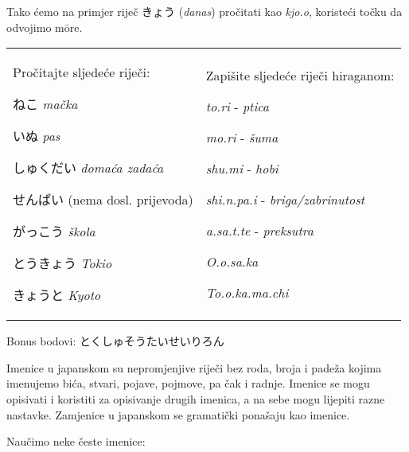 	\vspace{5pt}
	Tako ćemo na primjer riječ きょう (\textit{danas}) pročitati kao \textit{kjo.o}, koristeći točku da odvojimo m\={o}re.
	
	
	\begin{tabular}{p{200pt} p{200pt}}
		\begin{mondai}{Pročitajte sljedeće riječi:}
			\item ねこ \textit{mačka}
			\item いぬ \textit{pas}
			\item しゅくだい \textit{domaća zadaća}
			\item せんぱい (nema dosl. prijevoda)
			\item がっこう \textit{škola}
			\item とうきょう \textit{Tokio}
			\item きょうと \textit{Kyoto}
		\end{mondai}
		&
		\begin{mondai}{Zapišite sljedeće riječi hiraganom:}
			\item \textit{to.ri} - \textit{ptica}
			\item \textit{mo.ri} - \textit{šuma}
			\item \textit{shu.mi} - \textit{hobi}
			\item \textit{shi.n.pa.i} - \textit{briga/zabrinutost}
			\item \textit{a.sa.t.te} - \textit{preksutra}
			\item \textit{O.o.sa.ka}
			\item \textit{To.o.ka.ma.chi}
		\end{mondai}\\
	\end{tabular}
	
	Bonus bodovi: とくしゅそうたいせいりろん
	
\newpage
{}


	
	
	Imenice u japanskom su nepromjenjive riječi bez roda, broja i padeža kojima imenujemo bića, stvari, pojave, pojmove, pa čak i radnje. Imenice se mogu opisivati i koristiti za opisivanje drugih imenica, a na sebe mogu lijepiti razne nastavke. Zamjenice u japanskom se gramatički ponašaju kao imenice.

Naučimo neke česte imenice:
\vspace{10pt}


